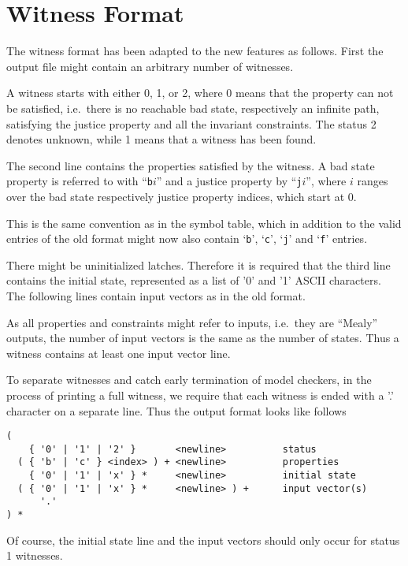 \documentclass{llncs}
\begin{document}
\section{Witness Format}

The witness format has been adapted to the new features as follows.
First the output file might contain an arbitrary number of witnesses.

A witness starts with either 0, 1, or 2, where 0 means that the property can
not be satisfied, i.e.~there is no reachable bad state, respectively an
infinite path, satisfying the justice property and all the invariant
constraints.  The status 2 denotes unknown, while 1 means that a witness has
been found.

The second line contains the properties satisfied by the witness.
A bad state property is referred to with ``\texttt{b}$i$'' and a
justice property by ``\texttt{j}$i$'', where $i$ ranges over the bad
state respectively justice property indices, which start at 0.

This is the same convention as in the symbol table, which in addition
to the valid entries of the old format might now also contain
`\texttt{b}', `\texttt{c}', `\texttt{j}' and
`\texttt{f}' entries.

There might be uninitialized latches.  Therefore it is required that the third
line contains the initial state, represented as a list of '0' and '1' ASCII
characters.  The following lines contain input vectors as in the old format.

As all properties and constraints might refer to inputs, i.e.~they are ``Mealy''
outputs, the number of input vectors is the same as the number of states.
Thus a witness contains at least one input vector line.

To separate witnesses and catch early termination of model checkers, in the
process of printing a full witness, we require that each witness is
ended with a '.' character on a separate line.
Thus the output format looks like follows
{\small
\begin{verbatim}
(
    { '0' | '1' | '2' }       <newline>          status
  ( { 'b' | 'c' } <index> ) + <newline>          properties
    { '0' | '1' | 'x' } *     <newline>          initial state
  ( { '0' | '1' | 'x' } *     <newline> ) +      input vector(s)
      '.'
) *
\end{verbatim}}

Of course, the initial state line and the input vectors should
only occur for status 1 witnesses.
\end{document}
